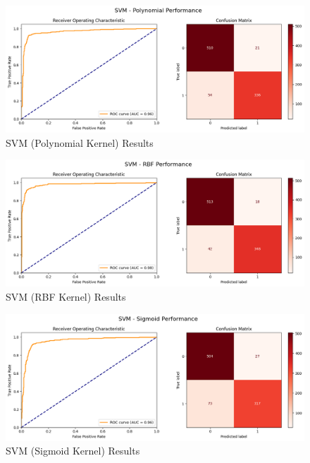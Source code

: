 \documentclass[12pt]{article}
\begin{document}
\begin{figure}[H]
\centering
\includegraphics[width=1\textwidth]{images/svm2.png}
\caption{SVM (Polynomial Kernel) Results}
\end{figure}

\begin{figure}[H]
\centering
\includegraphics[width=1\textwidth]{images/svm3.png}
\caption{SVM (RBF Kernel) Results}
\end{figure}

\begin{figure}[H]
\centering
\includegraphics[width=1\textwidth]{images/svm4.png}
\caption{SVM (Sigmoid Kernel) Results}
\end{figure}
\end{document}
